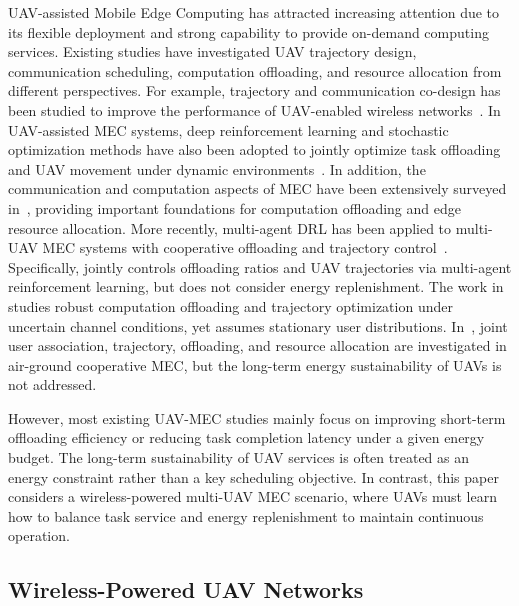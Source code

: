 \documentclass[journal]{IEEEtran}
\begin{document}
UAV-assisted Mobile Edge Computing has attracted 
increasing attention due to its flexible deployment and strong 
capability to provide on-demand computing services. Existing 
studies have investigated UAV trajectory design, communication 
scheduling, computation offloading, and resource allocation 
from different perspectives. For example, trajectory and 
communication co-design has been studied to improve the 
performance of UAV-enabled wireless networks~\cite{zeng2019energy, 
wu2018joint}. In UAV-assisted MEC systems, deep reinforcement 
learning and stochastic optimization methods have also been 
adopted to jointly optimize task offloading and UAV movement 
under dynamic environments~\cite{jie2020drl, zhang2018stochastic}. 
In addition, the communication and computation aspects of MEC 
have been extensively surveyed in~\cite{mao2017survey}, providing 
important foundations for computation offloading and edge 
resource allocation. 
More recently, multi-agent DRL has been applied to multi-UAV 
MEC systems with cooperative offloading and trajectory 
control~\cite{lee2024marl, li2024robust, wang2024joint}. 
Specifically, \cite{lee2024marl} jointly controls offloading 
ratios and UAV trajectories via multi-agent reinforcement 
learning, but does not consider energy replenishment. 
The work in~\cite{li2024robust} studies robust computation 
offloading and trajectory optimization under uncertain channel 
conditions, yet assumes stationary user distributions. 
In~\cite{wang2024joint}, joint user association, trajectory, 
offloading, and resource allocation are investigated in 
air-ground cooperative MEC, but the long-term energy 
sustainability of UAVs is not addressed.

However, most existing UAV-MEC studies mainly focus on 
improving short-term offloading efficiency or reducing task 
completion latency under a given energy budget. The long-term 
sustainability of UAV services is often treated as an energy 
constraint rather than a key scheduling objective. In contrast, 
this paper considers a wireless-powered multi-UAV MEC scenario, 
where UAVs must learn how to balance task service and energy 
replenishment to maintain continuous operation.

\subsection{Wireless-Powered UAV Networks}
\end{document}
